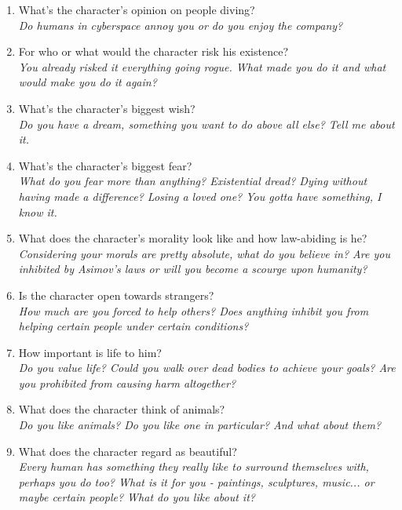 \documentclass[12pt,a4paper,openany]{book}
\begin{document}
\begin{enumerate}
		\item What’s the character’s opinion on people diving?\\
		\textit{Do humans in cyberspace annoy you or do you enjoy the company?}
		\item For who or what would the character risk his existence?\\
		\textit{You already risked it everything going rogue. What made you do it and what would make you do it again?}
		\item What’s the character’s biggest wish?\\
		\textit{Do you have a dream, something you want to do above all else? Tell me about it.}
		\item What’s the character’s biggest fear?\\
		\textit{What do you fear more than anything? Existential dread? Dying without having made a difference? Losing a loved one? You gotta have something, I know it.}
		\item What does the character’s morality look like and how law-abiding is he?\\
		\textit{Considering your morals are pretty absolute, what do you believe in? Are you inhibited by Asimov's laws or will you become a scourge upon humanity?}
		\item Is the character open towards strangers?\\
		\textit{How much are you forced to help others? Does anything inhibit you from helping certain people under certain conditions?}
		\item How important is life to him?\\
		\textit{Do you value life? Could you walk over dead bodies to achieve your goals? Are you prohibited from causing harm altogether?}
		\item What does the character think of animals?\\
		\textit{Do you like animals? Do you like one in particular? And what about them?}
		\item What does the character regard as beautiful?\\
		\textit{Every human has something they really like to surround themselves with, perhaps you do too? What is it for you - paintings, sculptures, music... or maybe certain people? What do you like about it?}

\end{enumerate}
\end{document}
